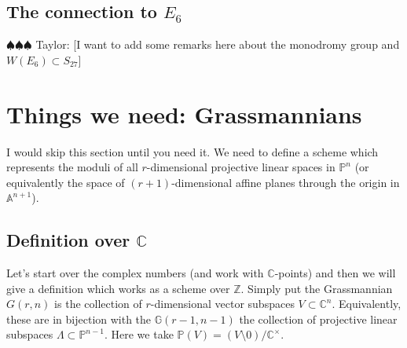 \documentclass[12pt]{article}
\numberwithin{equation}{section}
\theoremstyle{definition}
\theoremstyle{remark}
\newcommand{\CC}{\mathbb{C}}
\newcommand{\ZZ}{\mathbb{Z}}
\newcommand{\PP}{\mathbb{P}}
\renewcommand{\AA}{\mathbb{A}}
\newcommand{\GG}{\mathbb{G}}
\newcommand{\taylor}[1]{{\color{blue} \sf $\spadesuit\spadesuit\spadesuit$ Taylor: [#1]}}
\begin{document}
\subsection{The connection to $E_6$}

\taylor{I want to add some remarks here about the monodromy group and $W(E_6) \subset S_{27}$}



\section{Things we need: Grassmannians}
I would skip this section until you need it. 
We need to define a scheme which represents the moduli of all $r$-dimensional projective linear spaces  in $\PP^n$ (or equivalently the space of $(r+1)$-dimensional affine planes through the origin in $\AA^{n+1}$).
\subsection{Definition over $\CC$}
Let's start over the complex numbers (and work with $\CC$-points) and then we will give a definition which works as a scheme over $\ZZ$. 
Simply put the Grassmannian $G(r,n)$ is the collection of $r$-dimensional vector subspaces $V \subset \CC^n$. 
Equivalently, these are in bijection with the $\GG(r-1,n-1)$ the collection of projective linear subspaces $\Lambda \subset \PP^{n-1}$. 
Here we take $\PP(V) = (V\setminus 0)/\CC^{\times}$.
\end{document}
